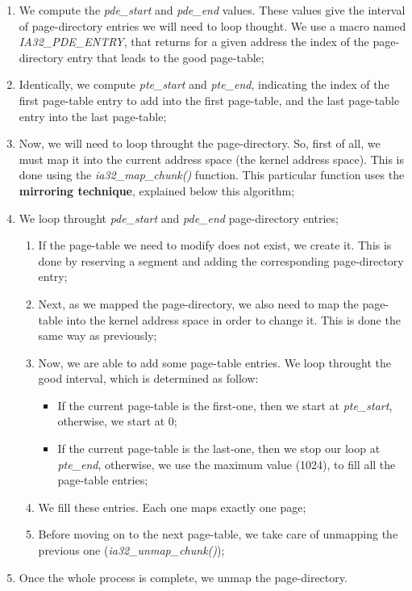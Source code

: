 \begin{enumerate}
\item
  We compute the \textit{pde\_start} and \textit{pde\_end}
  values. These values give the interval of page-directory entries we
  will need to loop thought. We use a macro named \textit{IA32\_PDE\_ENTRY},
  that returns for a given address the index of the page-directory
  entry that leads to the good page-table;
\item
  Identically, we compute \textit{pte\_start} and \textit{pte\_end},
  indicating the index of the first page-table entry to add into the
  first page-table, and the last page-table entry into the last
  page-table;
\item
  Now, we will need to loop throught the page-directory. So, first of
  all, we must map it into the current address space (the kernel
  address space). This is done using the \textit{ia32\_map\_chunk()}
  function. This particular function uses the \textbf{mirroring
  technique}, explained below this algorithm;
\item
  We loop throught \textit{pde\_start} and \textit{pde\_end}
  page-directory entries;
  \begin{enumerate}
  \item
    If the page-table we need to modify does not exist, we create
    it. This is done by reserving a segment and adding the
    corresponding page-directory entry;
  \item
    Next, as we mapped the page-directory, we also need to map the
    page-table into the kernel address space in order to change
    it. This is done the same way as previously;
  \item
    Now, we are able to add some page-table entries. We loop
    throught the good interval, which is determined as follow:
    \begin{itemize}
    \item
      If the current page-table is the first-one, then we start at
      \textit{pte\_start}, otherwise, we start at 0;
    \item
      If the current page-table is the last-one, then we stop our loop
      at \textit{pte\_end}, otherwise, we use the maximum value
      (1024), to fill all the page-table entries;
    \end{itemize}
    \item
      We fill these entries. Each one maps exactly one page;
    \item
      Before moving on to the next page-table, we take care of
      unmapping the previous one (\textit{ia32\_unmap\_chunk()});
  \end{enumerate}
\item
  Once the whole process is complete, we unmap the page-directory.
\end{enumerate}

